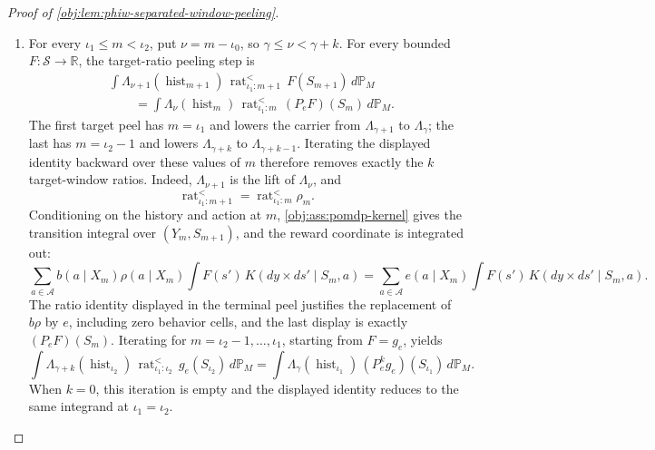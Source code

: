 \begin{proof}[Proof of \cref{obj:lem:phiw-separated-window-peeling}]
\begin{enumerate}
\item For every \(\iota_1\le m<\iota_2\), put \(\nu=m-\iota_0\), so
\(\gamma\le\nu<\gamma+k\).  For every bounded \(F:\mathcal S\to\mathbb R\), the target-ratio
peeling step is
\[
\begin{aligned}
&\int
\Lambda_{\nu+1}(\operatorname{hist}_{m+1})\,
\operatorname{rat}^{<}_{\iota_1:m+1}\,
F(S_{m+1})\,d\mathbb P_M \\
&\qquad =
\int
\Lambda_{\nu}(\operatorname{hist}_{m})\,
\operatorname{rat}^{<}_{\iota_1:m}\,
(P_eF)(S_m)\,d\mathbb P_M .
\end{aligned}
\]
The first target peel has \(m=\iota_1\) and lowers the carrier from \(\Lambda_{\gamma+1}\) to
\(\Lambda_\gamma\); the last has \(m=\iota_2-1\) and lowers \(\Lambda_{\gamma+k}\) to
\(\Lambda_{\gamma+k-1}\). Iterating the displayed identity backward over these values of \(m\)
therefore removes exactly the \(k\) target-window ratios. Indeed, \(\Lambda_{\nu+1}\) is the lift of
\(\Lambda_\nu\), and
\[
\operatorname{rat}^{<}_{\iota_1:m+1}
=
\operatorname{rat}^{<}_{\iota_1:m}\rho_m.
\]
Conditioning on the history and action at \(m\), \cref{obj:ass:pomdp-kernel} gives the transition integral over \((Y_m,S_{m+1})\), and the reward coordinate is integrated out:
\[
\sum_{a\in\mathcal A}
 b(a\mid X_m)\rho(a\mid X_m)
 \int F(s')\,K(dy\times ds'\mid S_m,a)
=
\sum_{a\in\mathcal A}
 e(a\mid X_m)
 \int F(s')\,K(dy\times ds'\mid S_m,a).
\]
The ratio identity displayed in the terminal peel justifies the replacement of \(b\rho\) by \(e\), including zero behavior cells, and the last display is exactly \((P_eF)(S_m)\).  Iterating for \(m=\iota_2-1,\ldots,\iota_1\), starting from \(F=g_e\), yields
\[
\int
\Lambda_{\gamma+k}(\operatorname{hist}_{\iota_2})\,
\operatorname{rat}^{<}_{\iota_1:\iota_2}\,
g_e(S_{\iota_2})\,d\mathbb P_M
=
\int
\Lambda_{\gamma}(\operatorname{hist}_{\iota_1})\,
(P_e^kg_e)(S_{\iota_1})\,d\mathbb P_M .
\]
When \(k=0\), this iteration is empty and the displayed identity reduces to the same integrand at \(\iota_1=\iota_2\).


\end{enumerate}
\end{proof}

